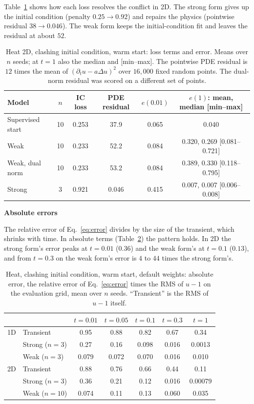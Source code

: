 \documentclass[a4paper,fleqn]{cas-sc}
\newcommand{\runhead}[1]{\par\medskip\noindent\textbf{#1}\par\nopagebreak\noindent\ignorespaces}
\begin{document}
Table~\ref{tab:giveup} shows how each loss resolves the conflict in 2D. The strong form gives up the initial condition
(penalty $0.25\to0.92$) and repairs the physics (pointwise residual $38\to0.046$). The weak form keeps the
initial-condition fit and leaves the residual at about $52$.

\begin{table}[htbp]
\centering
\caption{Heat 2D, clashing initial condition, warm start: loss terms and error. Means over $n$ seeds; at $t=1$ also
the median and [min--max]. The pointwise PDE residual is $12$ times the mean of $(\partial_tu-a\Delta u)^2$ over $16{,}000$
fixed random points. The dual-norm residual was scored on a different set of points.}
\label{tab:giveup}
\footnotesize
\setlength{\tabcolsep}{3pt}
\begin{tabular}{lccccc}
\toprule
Model & $n$ & IC loss & PDE residual & $e(0.01)$ & $e(1)$: mean, median [min--max] \\
\midrule
Supervised start & 10 & 0.253 & 37.9 & 0.065 & 0.040 \\
Weak & 10 & 0.233 & 52.2 & 0.084 & 0.320, 0.269 [0.081--0.721] \\
Weak, dual norm & 10 & 0.233 & 53.2 & 0.084 & 0.389, 0.330 [0.118--0.795] \\
Strong & 3 & 0.921 & 0.046 & 0.415 & 0.007, 0.007 [0.006--0.008] \\
\bottomrule
\end{tabular}
\end{table}

\runhead{Absolute errors}
The relative error of Eq.~\eqref{eq:error} divides by the size of the transient, which
shrinks with time. In absolute terms (Table~\ref{tab:abs}) the pattern holds. In 2D the strong form's error peaks at
$t=0.01$ ($0.36$) and the weak form's at $t=0.1$ ($0.13$), and from $t=0.3$ on the weak form's error is $4$ to $44$ times
the strong form's.

\begin{table}[htbp]
\centering
\caption{Heat, clashing initial condition, warm start, default weights: absolute error, the relative error of
Eq.~\eqref{eq:error} times the RMS of $u-1$ on the evaluation grid, mean over $n$ seeds. ``Transient'' is the RMS of
$u-1$ itself.}
\label{tab:abs}
\small
\setlength{\tabcolsep}{4pt}
\begin{tabular}{llccccc}
\toprule
 & & $t=0.01$ & $t=0.05$ & $t=0.1$ & $t=0.3$ & $t=1$ \\
\midrule
1D & Transient & 0.95 & 0.88 & 0.82 & 0.67 & 0.34 \\
 & Strong ($n=3$) & 0.27 & 0.16 & 0.098 & 0.016 & 0.0013 \\
 & Weak ($n=3$) & 0.079 & 0.072 & 0.070 & 0.016 & 0.010 \\
\midrule
2D & Transient & 0.88 & 0.76 & 0.66 & 0.44 & 0.11 \\
 & Strong ($n=3$) & 0.36 & 0.21 & 0.12 & 0.016 & 0.00079 \\
 & Weak ($n=10$) & 0.074 & 0.11 & 0.13 & 0.060 & 0.035 \\
\bottomrule
\end{tabular}
\end{table}
\end{document}
